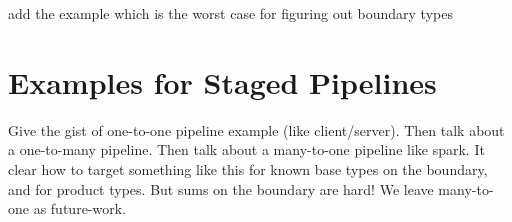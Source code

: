 \TODO add the example which is the worst case for figuring out boundary types




\section{Examples for Staged Pipelines}

Give the gist of one-to-one pipeline example (like client/server).
Then talk about a one-to-many pipeline.
Then talk about a many-to-one pipeline like spark.  It clear how to target something like this for known base types on the boundary, and for product types.  But sums on the boundary are hard!  We leave many-to-one as future-work.
